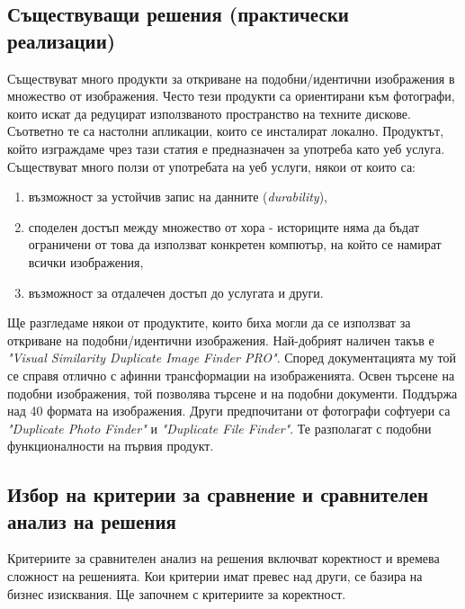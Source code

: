 \documentclass[a4paper,12pt]{article}
\begin{document}
\subsection{Съществуващи решения (практически реализации)}

Съществуват много продукти за откриване на подобни/идентични изображения в множество от изображения. Често тези продукти са ориентирани към фотографи, които искат да редуцират използваното пространство на техните дискове. Съответно те са настолни апликации, които се инсталират локално. Продуктът, който изграждаме чрез тази статия е предназначен за употреба като уеб услуга. Съществуват много ползи от употребата на уеб услуги, някои от които са:

\begin{enumerate}
    \item възможност за устойчив запис на данните (\textit{durability}),
    \item споделен достъп между множество от хора - историците няма да бъдат ограничени от това да използват конкретен компютър, на който се намират всички изображения,
    \item възможност за отдалечен достъп до услугата и други.
\end{enumerate}

\bigbreak

Ще разгледаме някои от продуктите, които биха могли да се използват за откриване на подобни/идентични изображения. Най-добрият наличен такъв е \textit{"Visual Similarity Duplicate Image Finder PRO"}. Според документацията му той се справя отлично с афинни трансформации на изображенията. Освен търсене на подобни изображения, той позволява търсене и на подобни документи. Поддържа над 40 формата на изображения. Други предпочитани от фотографи софтуери са \textit{"Duplicate Photo Finder"} и \textit{"Duplicate File Finder"}. Те разполагат с подобни функционалности на първия продукт.

\subsection{Избор на критерии за сравнение и сравнителен анализ на решения}

Критериите за сравнителен анализ на решения включват коректност и времева сложност на решенията. Кои критерии имат превес над други, се базира на бизнес изисквания. Ще започнем с критериите за коректност.

\bigbreak
\end{document}
